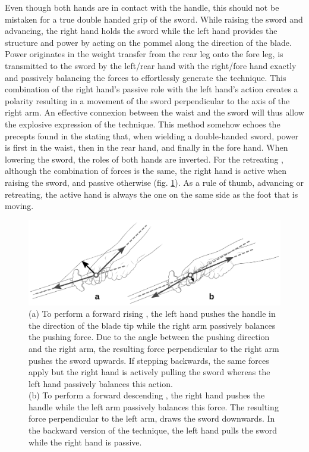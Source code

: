 Even though both hands are in contact with the handle,  this should not be mistaken for a true double handed grip of the sword. While raising the sword and advancing, the right hand holds the sword while the left hand provides the structure and power by acting on the pommel along the direction of the blade. Power originates in the weight transfer from the rear leg onto the fore leg, is transmitted to the sword by the left/rear hand with the right/fore hand exactly and passively balancing the forces to effortlessly generate the technique. This combination of the right hand's passive role with the left hand's action creates a polarity resulting in a movement of the sword perpendicular to the axis of the right arm. An effective connexion between the waist and the sword will thus allow the explosive expression of the \Duo{} technique. This method somehow echoes the precepts found in the \JianJing{} stating that, when wielding a double-handed sword, power is first in the waist, then in the rear hand, and finally in the fore hand. When lowering the sword, the roles of both hands are inverted.
For the retreating \Duo{}, although the combination of forces is the same, the right hand is active when raising the sword, and passive otherwise (fig. \ref{fig:duo_detail}). As a rule of thumb, advancing or retreating, the active hand is always the one on the same side as the foot that is moving.

\begin{figure}[ht]
	\centering
	
	\includegraphics[width=1.00\textwidth]{../../Images/JibenJianfa/Duo/DuoDetail.pdf}
	\caption[Balance of forces in \Duo{}]{(a) To perform a forward rising \Duo{}, the left hand pushes the handle in the direction of the blade tip while the right arm passively balances the pushing force. Due to the angle between the pushing direction and the right arm, the resulting force perpendicular to the right arm pushes the sword upwards. If stepping backwards, the same forces apply but the right hand is actively pulling the sword whereas the left hand passively balances this action.\\
	(b) To perform a forward descending \Duo{}, the right hand pushes the handle while the left arm passively balances this force. The resulting force perpendicular to the left arm, draws the sword downwards. In the backward version of the technique, the left hand pulls the sword while the right hand is passive.
	}
	\label{fig:duo_detail}
\end{figure} 


